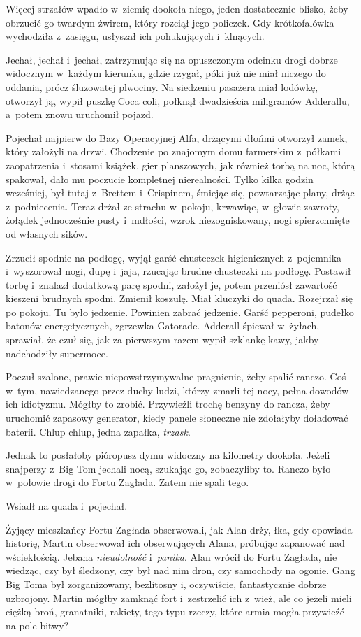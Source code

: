 \documentclass[oneside,polish,11pt,sfheadings]{mwbk}
\begin{document}
Więcej strzałów wpadło w~ziemię dookoła niego, jeden dostatecznie
blisko, żeby obrzucić go twardym żwirem, który rozciął jego policzek.
Gdy krótkofalówka wychodziła z~zasięgu, usłyszał ich pohukujących i~klnących.

Jechał, jechał i~jechał, zatrzymując się na opuszczonym odcinku drogi
dobrze widocznym w~każdym kierunku, gdzie rzygał, póki już nie miał
niczego do oddania, prócz śluzowatej plwociny. Na siedzeniu pasażera
miał lodówkę, otworzył ją, wypił puszkę Coca coli, połknął dwadzieścia
miligramów Adderallu, a~potem znowu uruchomił pojazd.

Pojechał najpierw do Bazy Operacyjnej Alfa, drżącymi dłońmi otworzył
zamek, który założyli na drzwi. Chodzenie po znajomym domu farmerskim z~półkami zaopatrzenia i~stosami książek, gier planszowych, jak również
torbą na noc, którą spakował, dało mu poczucie kompletnej nierealności.
Tylko kilka godzin wcześniej, był tutaj z~Brettem i~Crispinem, śmiejąc
się, powtarzając plany, drżąc z~podniecenia. Teraz drżał ze strachu w~pokoju, krwawiąc, w~głowie zawroty, żołądek jednocześnie pusty i~mdłości, wzrok niezogniskowany, nogi spierzchnięte od własnych sików.

Zrzucił spodnie na podłogę, wyjął garść chusteczek higienicznych z~pojemnika i~wyszorował nogi, dupę i~jaja, rzucając brudne chusteczki na
podłogę. Postawił torbę i~znalazł dodatkową parę spodni, założył je,
potem przeniósł zawartość kieszeni brudnych spodni. Zmienił koszulę.
Miał kluczyki do quada. Rozejrzał się po pokoju. Tu było jedzenie.
Powinien zabrać jedzenie. Garść pepperoni, pudełko batonów
energetycznych, zgrzewka Gatorade. Adderall śpiewał w~żyłach, sprawiał,
że czuł się, jak za pierwszym razem wypił szklankę kawy, jakby
nadchodziły supermoce.

Poczuł szalone, prawie niepowstrzymywalne pragnienie, żeby spalić
ranczo. Coś w~tym, nawiedzanego przez duchy ludzi, którzy zmarli tej
nocy, pełna dowodów ich idiotyzmu. Mógłby to zrobić. Przywieźli trochę
benzyny do rancza, żeby uruchomić zapasowy generator, kiedy panele
słoneczne nie zdołałyby doładować baterii. Chlup chlup, jedna zapałka,
\textit{trzask}.

Jednak to posłałoby pióropusz dymu widoczny na kilometry dookoła. Jeżeli
snajperzy z~Big Tom jechali nocą, szukając go, zobaczyliby to. Ranczo
było w~połowie drogi do Fortu Zagłada. Zatem nie spali tego.

Wsiadł na quada i~pojechał.

Żyjący mieszkańcy Fortu Zagłada obserwowali, jak Alan drży, łka, gdy
opowiada historię, Martin obserwował ich obserwujących Alana, próbując
zapanować nad wściekłością. Jebana \textit{nieudolność} i~\textit{panika}.
Alan wrócił do Fortu Zagłada, nie wiedząc, czy był śledzony, czy był nad
nim dron, czy samochody na ogonie. Gang Big Toma był zorganizowany,
bezlitosny i, oczywiście, fantastycznie dobrze uzbrojony. Martin mógłby
zamknąć fort i~zestrzelić ich z~wież, ale co jeżeli mieli ciężką broń,
granatniki, rakiety, tego typu rzeczy, które armia mogła przywieźć na
pole bitwy?
\end{document}

